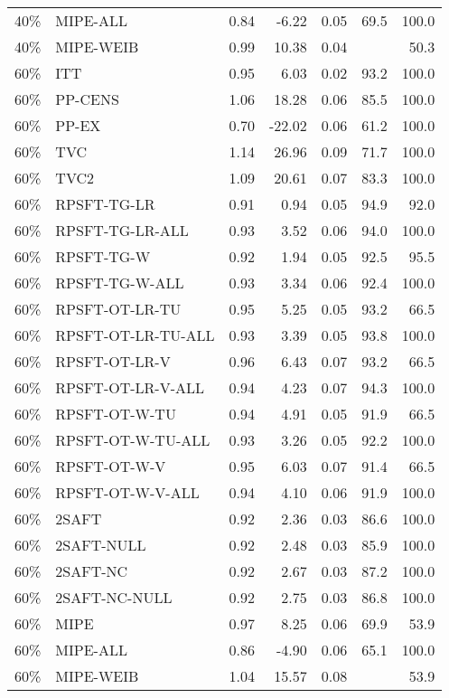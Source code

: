 \begin{table}[ht]
{\begin{tabular}{llrrrrr}
  40\% & MIPE-ALL & 0.84 & -6.22 & 0.05 & 69.5 & 100.0 \\ 
  40\% & MIPE-WEIB & 0.99 & 10.38 & 0.04 &  & 50.3 \\ 
   \hline
60\% & ITT & 0.95 & 6.03 & 0.02 & 93.2 & 100.0 \\ 
  60\% & PP-CENS & 1.06 & 18.28 & 0.06 & 85.5 & 100.0 \\ 
  60\% & PP-EX & 0.70 & -22.02 & 0.06 & 61.2 & 100.0 \\ 
  60\% & TVC & 1.14 & 26.96 & 0.09 & 71.7 & 100.0 \\ 
  60\% & TVC2 & 1.09 & 20.61 & 0.07 & 83.3 & 100.0 \\ 
   \hline
60\% & RPSFT-TG-LR & 0.91 & 0.94 & 0.05 & 94.9 & 92.0 \\ 
  60\% & RPSFT-TG-LR-ALL & 0.93 & 3.52 & 0.06 & 94.0 & 100.0 \\ 
  60\% & RPSFT-TG-W & 0.92 & 1.94 & 0.05 & 92.5 & 95.5 \\ 
  60\% & RPSFT-TG-W-ALL & 0.93 & 3.34 & 0.06 & 92.4 & 100.0 \\ 
  60\% & RPSFT-OT-LR-TU & 0.95 & 5.25 & 0.05 & 93.2 & 66.5 \\ 
  60\% & RPSFT-OT-LR-TU-ALL & 0.93 & 3.39 & 0.05 & 93.8 & 100.0 \\ 
  60\% & RPSFT-OT-LR-V & 0.96 & 6.43 & 0.07 & 93.2 & 66.5 \\ 
  60\% & RPSFT-OT-LR-V-ALL & 0.94 & 4.23 & 0.07 & 94.3 & 100.0 \\ 
   \hline
60\% & RPSFT-OT-W-TU & 0.94 & 4.91 & 0.05 & 91.9 & 66.5 \\ 
  60\% & RPSFT-OT-W-TU-ALL & 0.93 & 3.26 & 0.05 & 92.2 & 100.0 \\ 
  60\% & RPSFT-OT-W-V & 0.95 & 6.03 & 0.07 & 91.4 & 66.5 \\ 
  60\% & RPSFT-OT-W-V-ALL & 0.94 & 4.10 & 0.06 & 91.9 & 100.0 \\ 
   \hline
60\% & 2SAFT & 0.92 & 2.36 & 0.03 & 86.6 & 100.0 \\ 
  60\% & 2SAFT-NULL & 0.92 & 2.48 & 0.03 & 85.9 & 100.0 \\ 
  60\% & 2SAFT-NC & 0.92 & 2.67 & 0.03 & 87.2 & 100.0 \\ 
  60\% & 2SAFT-NC-NULL & 0.92 & 2.75 & 0.03 & 86.8 & 100.0 \\ 
  60\% & MIPE & 0.97 & 8.25 & 0.06 & 69.9 & 53.9 \\ 
  60\% & MIPE-ALL & 0.86 & -4.90 & 0.06 & 65.1 & 100.0 \\ 
  60\% & MIPE-WEIB & 1.04 & 15.57 & 0.08 &  & 53.9 \\ 
   \hline
\end{tabular}
}
\end{table}

